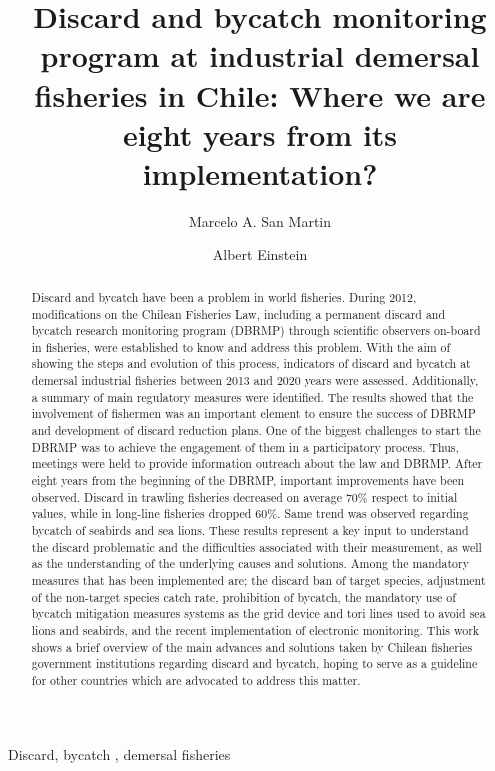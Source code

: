 \documentclass[
  super,
  preprint,
  3p]{elsarticle}
\begin{document}
\begin{frontmatter}
\title{Discard and bycatch monitoring program at industrial demersal
fisheries in Chile: Where we are eight years from its implementation?}
\author[1]{Marcelo A. San Martin%
%
}
\author[1]{Albert Einstein%
%
}




        
\begin{abstract}
Discard and bycatch have been a problem in world fisheries. During 2012,
modifications on the Chilean Fisheries Law, including a permanent
discard and bycatch research monitoring program (DBRMP) through
scientific observers on-board in fisheries, were established to know and
address this problem. With the aim of showing the steps and evolution of
this process, indicators of discard and bycatch at demersal industrial
fisheries between 2013 and 2020 years were assessed. Additionally, a
summary of main regulatory measures were identified. The results showed
that the involvement of fishermen was an important element to ensure the
success of DBRMP and development of discard reduction plans. One of the
biggest challenges to start the DBRMP was to achieve the engagement of
them in a participatory process. Thus, meetings were held to provide
information outreach about the law and DBRMP. After eight years from the
beginning of the DBRMP, important improvements have been observed.
Discard in trawling fisheries decreased on average 70\% respect to
initial values, while in long-line fisheries dropped 60\%. Same trend
was observed regarding bycatch of seabirds and sea lions. These results
represent a key input to understand the discard problematic and the
difficulties associated with their measurement, as well as the
understanding of the underlying causes and solutions. Among the
mandatory measures that has been implemented are; the discard ban of
target species, adjustment of the non-target species catch rate,
prohibition of bycatch, the mandatory use of bycatch mitigation measures
systems as the grid device and tori lines used to avoid sea lions and
seabirds, and the recent implementation of electronic monitoring. This
work shows a brief overview of the main advances and solutions taken by
Chilean fisheries government institutions regarding discard and bycatch,
hoping to serve as a guideline for other countries which are advocated
to address this matter.
\end{abstract}





\begin{keyword}
    Discard, bycatch \sep 
    demersal fisheries
\end{keyword}
\end{frontmatter}
\end{document}
